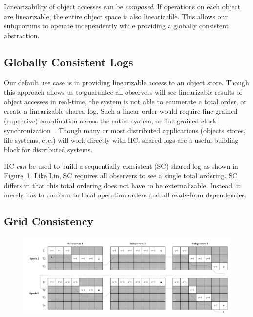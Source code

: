 Linearizability of object accesses can be \emph{composed}.
If operations on each object are linearizable, the entire object space is also linearizable.
This allows our subquorums to operate independently while providing a globally consistent abstraction.

\subsection{Globally Consistent Logs}
\label{sec:ch03_log_ordering}

Our default use case is in providing linearizable access to an object store.
Though this approach allows us to guarantee all observers will see linearizable results of object accesses in real-time, the system is not able to enumerate a total order, or create a linearizable shared log.
Such a linear order would require fine-grained (expensive) coordination across the entire system, or fine-grained clock synchronization~\cite{spanner}.
Though many or most distributed applications (objects stores, file systems, etc.) will work directly with HC, shared logs are a useful building block for distributed systems.

HC \emph{can} be used to build a sequentially consistent (SC) shared log as shown in Figure~\ref{fig:ch03_log_ordering}.
Like Lin, SC requires all observers to see a single total ordering.
SC differs in that this total ordering does not have to be externalizable.
Instead, it merely has to conform to local operation orders and all reads-from dependencies.

\subsection{Grid Consistency}
\label{ch03_grid_consistency}


\begin{landscape}
\begin{figure}
    \begin{center}
        \includegraphics[width=8.2in]{figures/ch03_log_ordering.pdf}
    \end{center}
    \renewcommand{\baselinestretch}{1}
    \small\normalsize

    \begin{quote}
        \caption[Grid Consistency: A Sequential Log Ordering]{}
        \label{fig:ch03_log_ordering}
    \end{quote}
\end{figure}
\renewcommand{\baselinestretch}{2}
\small\normalsize
\end{landscape}


